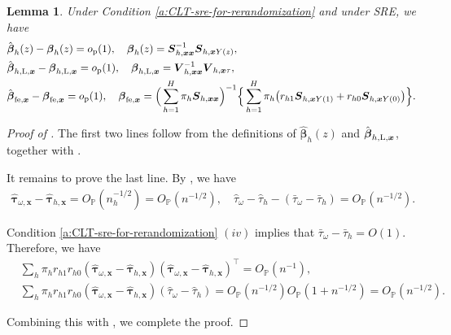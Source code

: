 \documentclass[12pt]{article}
\newtheorem{lemma}{Lemma}
\newcommand{\Lin}{\textnormal{L}}
\newcommand{\op}{o_{\textnormal{p}}}
\newcommand{\Op}{O_{\mathbb{P}}}
\newcommand{\fe}{\textnormal{fe}}
\newcommand{\bs}{\boldsymbol}
\begin{document}
\begin{lemma}
\label{lem:limit-of-regression-coefficient}
    Under Condition \ref{a:CLT-sre-for-rerandomization} and under SRE, we have 
    \begin{align*}
    & \hat{\bs{\beta}}_{h}(z) - \bs{\beta}_{h}(z) = \op(1), \quad \bs{\beta}_{h}(z) = \bs{S}_{h,\bs{x}\bs{x}}^{-1}\bs{S}_{h,\bs{x}Y(z)} ,\\
  & \hat{\bs{\beta}}_{h,\Lin,\bs{x}} - \bs{\beta}_{h, \Lin , \bs{x}} = \op(1), \quad \bs{\beta}_{h, \Lin , \bs{x}} = \bs{V}_{h,\bs{x}\bs{x}}^{-1}\bs{V}_{h,\bs{x}\tau},\\
    & \hat{\bs{\beta}}_{\fe, \bs{x}} - \bs{\beta}_{\fe, \bs{x}}  = \op(1), \quad \bs{\beta}_{\fe, \bs{x}} = \Big(\sum_{h=1}^H  \pi_{ h }\bs{S}_{h,\bs{x}\bs{x}}\Big)^{-1}\Big\{\sum_{h=1}^H  \pi_{ h }\big(r_{h1}\bs{S}_{h,\bs{x}Y(1)}+r_{h0}\bs{S}_{h,\bs{x}Y(0)}\big)\Big\}.
  \end{align*}
\end{lemma}
\begin{proof}[Proof of ]
The first two lines follow  from the definitions of $\hat{\bs{\beta}}_{h}(z)$ and $\hat{\bs{\beta}}_{h,\Lin,\bs{x}}$, together with .

  It remains to prove the last line. By , we have
    \begin{align*}
\hat{\bs{\tau}}_{\omega,\bs{x}} - \hat{\bs{\tau}}_{h,\bs{x}} = \Op(n_h^{-1/2}) = \Op(n^{-1/2}),\quad \hat{\tau}_{\omega} - \hat{\tau}_{h} - (\bar{\tau}_{\omega} - \bar{\tau}_h) = \Op(n^{-1/2}).
    \end{align*}
  
Condition \ref{a:CLT-sre-for-rerandomization} $(iv)$ implies that $\bar{\tau}_{\omega} - \bar{\tau}_h = O(1)$. Therefore, we have
\begin{align*}
&\sum_{h}\pi_h r_{h1}r_{h0}(\hat{\bs{\tau}}_{\omega,\bs{x}} - \hat{\bs{\tau}}_{h,\bs{x}})(\hat{\bs{\tau}}_{\omega,\bs{x}} - \hat{\bs{\tau}}_{h,\bs{x}})^\top = \Op(n^{-1}),\\
    &\sum_{h}\pi_h r_{h1}r_{h0}(\hat{\bs{\tau}}_{\omega,\bs{x}} - \hat{\bs{\tau}}_{h,\bs{x}})(\hat{\tau}_{\omega} - \hat{\tau}_{h}) = \Op(n^{-1/2})\Op(1+n^{-1/2}) =  \Op(n^{-1/2}).
\end{align*}
    

    Combining this with , we complete the proof.
\end{proof}
\end{document}
